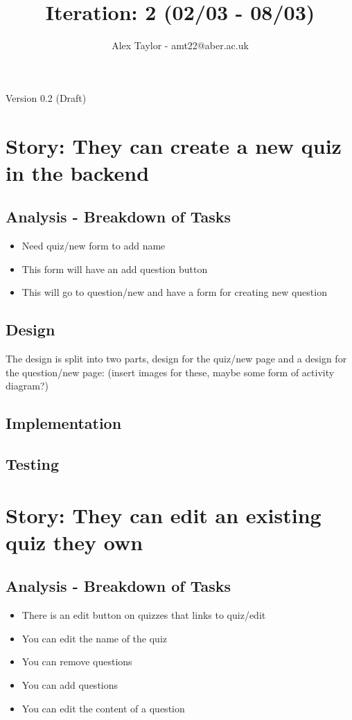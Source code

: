 \documentclass{article}
\title{Iteration: 2 (02/03 - 08/03)}
\author{Alex Taylor - amt22@aber.ac.uk}
\begin{document}
\maketitle
\begin{center}
	Version 0.2 (Draft)
\end{center}
\tableofcontents
\thispagestyle{empty}
\newpage

\section{Story: They can create a new quiz in the backend}
\subsection{Analysis - Breakdown of Tasks}
\begin{itemize}
	\item Need quiz/new form to add name
	\item This form will have an add question button
	\item This will go to question/new and have a form for creating new question
\end{itemize}
\subsection{Design}
The design is split into two parts, design for the quiz/new page and a design for the question/new page:
(insert images for these, maybe some form of activity diagram?)
\subsection{Implementation}
\subsection{Testing}
\newpage

\section{Story: They can edit an existing quiz they own}
\subsection{Analysis - Breakdown of Tasks}
\begin{itemize}
	\item There is an edit button on quizzes that links to quiz/edit
	\item You can edit the name of the quiz
	\item You can remove questions
	\item You can add questions
	\item You can edit the content of a question
\end{itemize}
\end{document}
